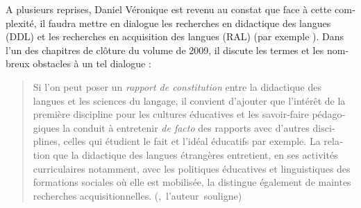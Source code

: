 \documentclass[french, output=paper]{langscibook}
\begin{document}
\begin{otherlanguage}{french}
A plusieurs reprises, Daniel Véronique est revenu au constat que face à cette complexité, il faudra mettre en dialogue les recherches en didactique des langues (DDL) et les recherches en acquisition des langues (RAL) (par exemple \citealt{Véronique2000recherches, Véronique2009}). Dans l’un des chapitres de clôture du volume de 2009, il discute les termes et les nombreux obstacles à un tel dialogue :

\begin{quote}
Si l’on peut poser un \textit{rapport de constitution} entre la didactique des langues et les sciences du langage, il convient d’ajouter que l’intérêt de la première discipline pour les cultures éducatives et les savoir-faire pédagogiques la conduit à entretenir \textit{de facto} des rapports avec d’autres disciplines, celles qui étudient le fait et l’idéal éducatifs par exemple. La relation que la didactique des langues étrangères entretient, en ses activités curriculaires notamment, avec les politiques éducatives et linguistiques des formations sociales où elle est mobilisée, la distingue également de maintes recherches acquisitionnelles. \hfill\hbox{(\citealt[326]{Véronique2009}, l’auteur souligne)}
\end{quote}


\end{otherlanguage}
\end{document}
